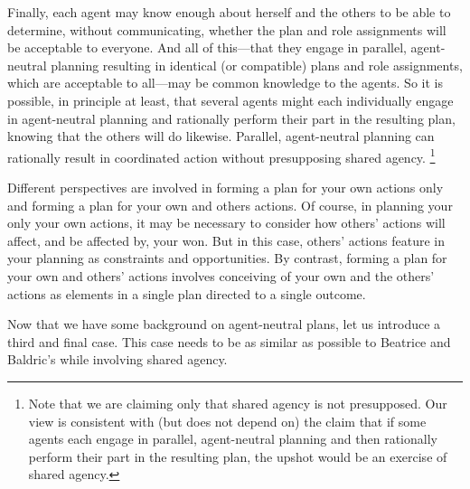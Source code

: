 \documentclass[12pt,\papersize]{extarticle}
\begin{document}
%
Finally, each agent may know enough about herself and the others to be able to determine, without communicating, whether the plan and role assignments will be acceptable to everyone. 
	And all of this---that they engage in parallel, agent-neutral planning resulting in identical (or compatible) plans and role assignments, which are acceptable to all---may be common knowledge to the agents.
	So it is possible, in principle at least, 
	that several agents might each individually engage in agent-neutral planning and rationally perform their part in the resulting plan, knowing that the others will do likewise.
	Parallel, agent-neutral planning can rationally result in coordinated action without presupposing shared agency.%
\footnote{
Note that we are claiming only that shared agency is not presupposed.
Our view is consistent with (but does not depend on) the claim
that
	if some agents each engage in parallel, agent-neutral planning and then rationally perform their part in the resulting plan,
	the upshot would be an exercise of shared agency.
}


Different perspectives are involved in
	forming a plan for  your own actions  only
and 
	forming a plan for  your own and others actions.
  Of course, in planning your only your own actions, it may be necessary to consider how others' actions will affect, and be affected by, your won.
But in this case,  others' actions feature in your planning as constraints and opportunities.
By contrast, forming a plan for your own and others' actions 
	involves conceiving of your own and the others' actions as elements in a single plan directed to a single outcome.


Now that we have some background on agent-neutral plans,
let us introduce a third and final case.
This case needs to be as similar as possible to Beatrice and Baldric's while involving shared agency.
\end{document}
